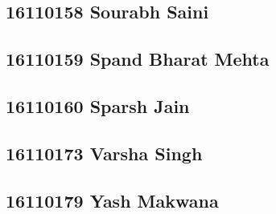 \documentclass[journal=jpcbfk,manuscript=article]{achemso}
\begin{document}
\subsection {16110158	Sourabh Saini}

\subsection {16110159	Spand Bharat Mehta}

\subsection {16110160	Sparsh Jain}

\subsection {16110173	Varsha Singh}

\subsection {16110179	Yash Makwana}


%
%
\end{document}
